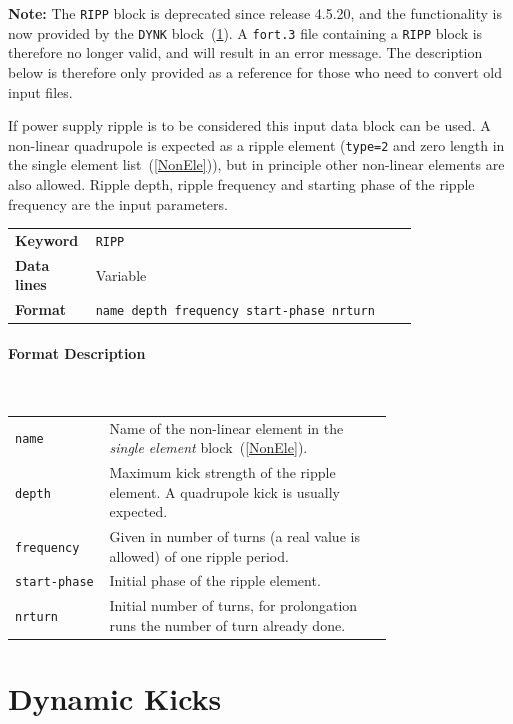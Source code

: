 \textcolor{notered}{\textbf{Note:}
The \texttt{RIPP} block is deprecated since release 4.5.20, and the functionality is now provided by the \texttt{DYNK} block~(\ref{sec:DYNK}).
A \texttt{fort.3} file containing a \texttt{RIPP} block is therefore no longer valid, and will result in an error message.
The description below is therefore only provided as a reference for those who need to convert old input files.}

\bigskip
\noindent If power supply ripple is to be considered this input data block can be used. A non-linear quadrupole is expected as a ripple element (\texttt{type=2} and zero length in the single element list~(\ref{NonEle})), but in principle other non-linear elements are also allowed.
Ripple depth, ripple frequency and starting phase of the ripple frequency are the input parameters.

\bigskip
\begin{tabular}{@{}lp{0.8\linewidth}}
    \textbf{Keyword}    & \texttt{RIPP} \\
    \textbf{Data lines} & Variable \\
    \textbf{Format}     & \texttt{name depth frequency start-phase nrturn}
\end{tabular}

\paragraph{Format Description}~

\bigskip
\begin{longtabu}{@{}lp{0.75\linewidth}}
    \texttt{name}        & Name of the non-linear element in the \textit{single element} block~(\ref{NonEle}). \\
    \texttt{depth}       & Maximum kick strength of the ripple element. A quadrupole kick is usually expected. \\
    \texttt{frequency}   & Given in number of turns (a real value is allowed) of one ripple period. \\
    \texttt{start-phase} & Initial phase of the ripple element. \\
    \texttt{nrturn}      & Initial number of turns, for prolongation runs the  number of turn already done.
\end{longtabu}

\section{Dynamic Kicks} \label{sec:DYNK}

